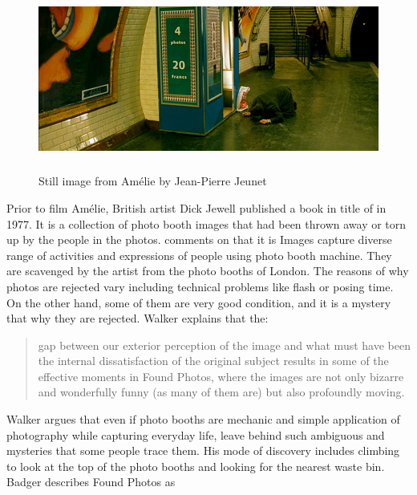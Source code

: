 \begin{figure}[h!]
  \centering
  \includegraphics[height=6cm]{graphics/amelie_01.jpg}
  \caption{Still image from Amélie by Jean-Pierre Jeunet}
  \label{fig:Amelie}
\end{figure}

Prior to film Amélie, British artist Dick Jewell published a book in title of  in 1977. It is a collection of photo booth images that had been thrown away or torn up by the people in the photos. \cite{walker2010dick} comments on that it is  Images capture diverse range of activities and expressions of people using photo booth machine. They are scavenged by the artist from the photo booths of London. The reasons of why photos are rejected vary including technical problems like flash or posing time. On the other hand, some of them are very good condition, and it is a mystery that why they are rejected. Walker explains that the:

\begin{quote}
gap between our exterior perception of the image and what must have been the internal dissatisfaction of the original subject results in some of the effective moments in Found Photos, where the images are not only bizarre and wonderfully funny (as many of them are) but also profoundly moving.
\end{quote}

Walker argues that even if photo booths are mechanic and simple application of photography while capturing everyday life, leave behind such ambiguous and mysteries that some people trace them.  His mode of discovery includes climbing to look at the top of the photo booths and looking for the nearest waste bin. Badger describes Found Photos as 

